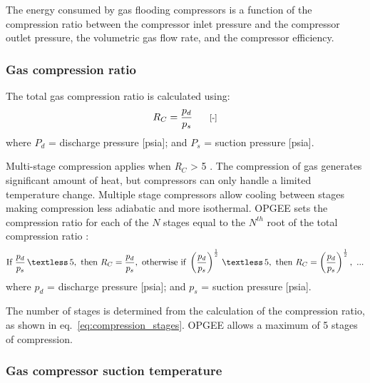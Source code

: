\documentclass[11pt]{report}
\newcommand{\marg}[1]{{\footnotesize\textit{\textcolor{stanford}{'#1'}}}}
\newcommand{\marginnote}[1]{\marginpar{\marg{#1}}}
\begin{document}
{The energy consumed by gas flooding compressors is a function of the compression ratio between the compressor inlet pressure and the compressor outlet pressure, the volumetric gas flow rate, and the compressor efficiency. 



\subsubsection{Gas compression ratio}

The total gas compression ratio is calculated using: 
\begin{equation} \label{eq:compression_ratio}
R_{C} = \frac{p_{d}}{p_{s}} \begin{footnotesize} \quad\quad\text{[-]} \end{footnotesize}
\end{equation}
where $P_{d}$ = discharge pressure [psia]; and $P_{s}$ = suction pressure [psia]. 

Multi-stage compression applies when \textit{R$_C$} > 5 \cite[p. 295]{Mcallister2009}. The compression of gas generates significant amount of heat, but compressors can only handle a limited temperature change. Multiple stage compressors allow cooling between stages making compression less adiabatic and more isothermal. OPGEE sets the compression ratio for each of the $N$ stages equal to the $N^{th}$ root of the total compression ratio \cite[p. 295]{Mcallister2009}: \marginnote{Production \& Extraction 2.5.1} 
\begin{equation} \label{eq:compression_stages}
\text{If} \,\,\frac{p_{d}}{p_{s}}\, \textless \, 5, \,\, \text{then}\,\, R_C=\frac{p_{d}}{p_{s}},\,\, \text{otherwise if}\,\,\left(\frac{p_{d}}{p_{s}}\right)^{\frac{1}{2}}\, \textless \,5,\,\,\text{then}\,\, R_C=\left(\frac{p_{d}}{p_{s}}\right)^{\frac{1}{2}},\,\,... 
\end{equation}
where $p_{d}$ = discharge pressure [psia]; and $p_{s}$ = suction pressure [psia].

The number of stages is determined from the calculation of the compression ratio, as shown in eq.\ \eqref{eq:compression_stages}. OPGEE allows a maximum of 5 stages of compression. 


\subsubsection{Gas compressor suction temperature}

}
\end{document}
